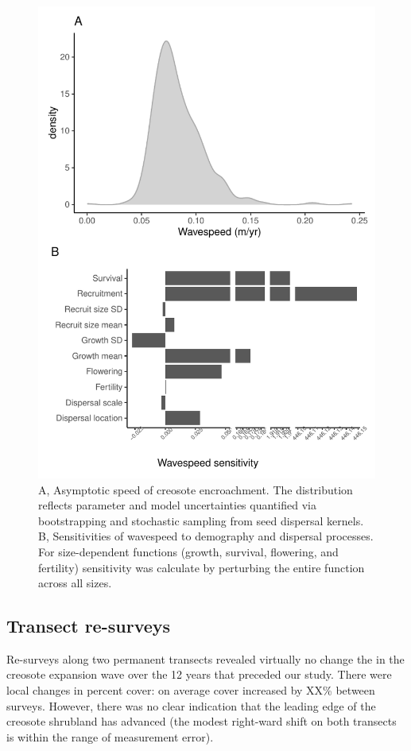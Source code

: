 \documentclass[11pt]{article}\usepackage[]{graphicx}\usepackage[usenames,dvipsnames]{xcolor}
\begin{document}
\begin{figure}[H]
  \begin{center}
    \includegraphics[width=\linewidth]{Figures/wavespeed_sens}
  \caption{A, Asymptotic speed of creosote encroachment. The distribution reflects parameter and model uncertainties quantified via bootstrapping and stochastic sampling from seed dispersal kernels. B, Sensitivities of wavespeed to demography and dispersal processes. For size-dependent functions (growth, survival, flowering, and fertility) sensitivity was calculate by perturbing the entire function across all sizes.}
  \label{fig:wavespeed}
  \end{center}
\end{figure}

\subsection*{Transect re-surveys}
Re-surveys along two permanent transects revealed virtually no change the in the creosote expansion wave over the 12 years that preceded our study.
There were local changes in percent cover: on average cover increased by XX\% between surveys.
However, there was no clear indication that the leading edge of the creosote shrubland has advanced (the modest right-ward shift on both transects is within the range of measurement error). 
\end{document}
